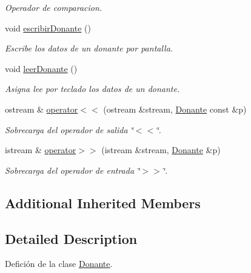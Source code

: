 \begin{DoxyCompactItemize}
\begin{DoxyCompactList}\small\item\em Operador de comparacion. \end{DoxyCompactList}\item 
void \hyperlink{classed_1_1Donante_a6eaca430e33a875ea87b65d7b755d24d}{escribir\-Donante} ()
\begin{DoxyCompactList}\small\item\em Escribe los datos de un donante por pantalla. \end{DoxyCompactList}\item 
void \hyperlink{classed_1_1Donante_abbf8fc955836761e5efec2c888a87032}{leer\-Donante} ()
\begin{DoxyCompactList}\small\item\em Asigna lee por teclado los datos de un donante. \end{DoxyCompactList}\item 
ostream \& \hyperlink{classed_1_1Donante_abf722a02c1261a0148fd3529ecbb0d0a}{operator$<$$<$} (ostream \&stream, \hyperlink{classed_1_1Donante}{Donante} const \&p)
\begin{DoxyCompactList}\small\item\em Sobrecarga del operador de salida \char`\"{}$<$$<$\char`\"{}. \end{DoxyCompactList}\item 
istream \& \hyperlink{classed_1_1Donante_afab845cf76f83a496fb1862f7ca15c5f}{operator$>$$>$} (istream \&stream, \hyperlink{classed_1_1Donante}{Donante} \&p)
\begin{DoxyCompactList}\small\item\em Sobrecarga del operador de entrada \char`\"{}$>$$>$\char`\"{}. \end{DoxyCompactList}\end{DoxyCompactItemize}
\subsection*{Additional Inherited Members}


\subsection{Detailed Description}
Defición de la clase \hyperlink{classed_1_1Donante}{Donante}. 

